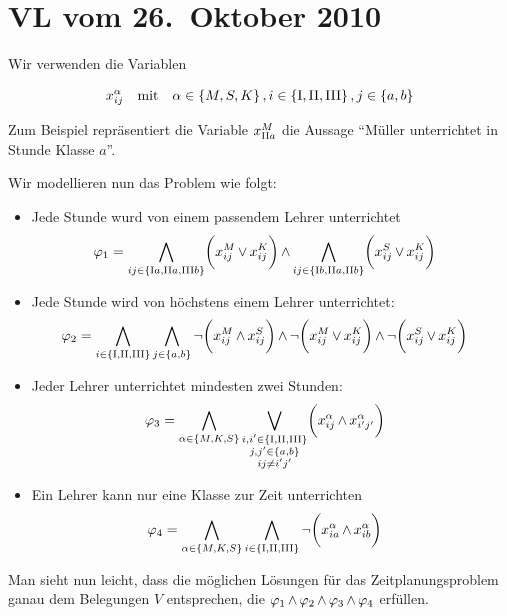\section{VL vom 26.~Oktober 2010}

Wir verwenden die Variablen 

\begin{align}
  x_{ij}^\alpha \quad\text{mit}\quad \alpha \in \left\{M,S,K\right\}, i \in \left\{\text{I},\text{II},\text{III}\right\}, j \in \left\{a,b\right\}
\end{align}

Zum Beispiel repräsentiert die Variable $x_{\text{II} a}^M$ die Aussage
\enquote{Müller unterrichtet in Stunde \II Klasse $a$}.

Wir modellieren nun das Problem wie folgt:

\begin{itemize}
  \item Jede Stunde wurd von einem passendem Lehrer unterrichtet
  \begin{align}
    \varphi_1 &=
      \operatorname*{\bigwedge}_{ij \in\left\{\text{I} a,\text{II} a,\text{III} b\right\}} \biggl(x_{ij}^M \operatorname{\vee} x_{ij}^K\biggr) \operatorname{\wedge}
      \operatorname*{\bigwedge}_{ij \in\left\{\text{I} b,\text{II} a,\text{II} b\right\}}  \biggl(x_{ij}^S \operatorname{\vee} x_{ij}^K\biggr)
  \end{align}
  
  \item Jede Stunde wird von höchstens einem Lehrer unterrichtet:
  \begin{align}
    \varphi_2 &=
      \operatorname*{\bigwedge}_{i\in\left\{\text{I},\text{II},\text{III}\right\}} \operatorname*{\bigwedge}_{j\in\left\{a,b\right\}}
        \operatorname{\neg} \biggl(x_{ij}^M \operatorname{\wedge} x_{ij}^S\biggr) \operatorname{\wedge}
        \operatorname{\neg} \biggl(x_{ij}^M \operatorname{\vee} x_{ij}^K\biggr) \operatorname{\wedge}
        \operatorname{\neg} \biggl(x_{ij}^S \operatorname{\vee} x_{ij}^K\biggr)
  \end{align}
  
  \item Jeder Lehrer unterrichtet mindesten zwei Stunden:
  \begin{align}
    \varphi_3 &=
      \operatorname*{\bigwedge}_{\alpha\in\left\{M,K,S\right\}} \operatorname*{\bigvee}_{\substack{i,i'\in\left\{\text{I},\text{II},\text{III}\right\}\\ j,j'\in\left\{a,b\right\}\\ ij\not=i'j'}}
        \biggl(x_{ij}^\alpha \operatorname{\wedge} x_{i'j'}^\alpha\biggr)
  \end{align}
  
  \item Ein Lehrer kann nur eine Klasse zur Zeit unterrichten
  \begin{align}
    \varphi_4 &=
      \operatorname*{\bigwedge}_{\alpha\in\left\{M,K,S\right\}} \operatorname*{\bigwedge}_{i\in\left\{\text{I},\text{II},\text{III}\right\}}
        \operatorname{\neg} \biggl(x_{ia}^\alpha \operatorname{\wedge} x_{ib}^\alpha\biggr)
  \end{align}
\end{itemize}

Man sieht nun leicht, dass die möglichen Lösungen für das Zeitplanungsproblem
ganau dem Belegungen $V$ entsprechen, die
$\varphi_1 \operatorname{\wedge} \varphi_2 \operatorname{\wedge} \varphi_3 \operatorname{\wedge} \varphi_4$ erfüllen.
